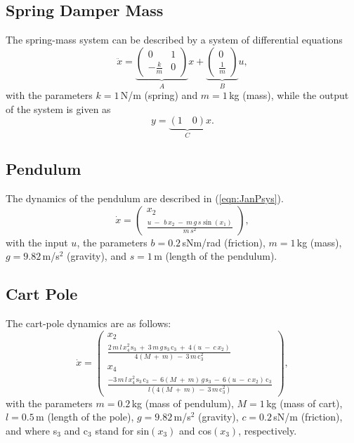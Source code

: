 \documentclass[letterpaper, 10 pt, conference]{ieeeconf}  %
\begin{document}
\subsection{Spring Damper Mass}
The spring-mass system can be described by a system of differential equations
\begin{equation}\label{eqn:JanSMsys}
	\ddot{x}=
	\underbrace{
		\left( {\begin{array}{cc}
			0 &1\\
			-\frac{k}{m} &0\end{array} } \right)}_{A}x + 
	\underbrace{
		\left( {\begin{array}{cc}
		0\\
		\frac{1}{m}\end{array} } \right)}_{B}u,
\end{equation}
with the parameters $k=1$\,N/m (spring) and $m=1$\,kg (mass),
while the output of the system is given as
\begin{equation}\label{eqn:JanSMoutput}
	y=
	\underbrace{
		(1\quad 0)}_{C}x.
\end{equation}
\subsection{Pendulum}
The dynamics of the pendulum are described in (\ref{eqn:JanPsys}).
\begin{equation}\label{eqn:JanPsys}
\dot{x}=
	\left( {\begin{array}{cc}
		x_2\\
		\tfrac{u \: - \: \,b\,x_2 \: - \: m\,g\,s\sin(x_1)}{m\,s^2}\end{array} } \right),
\end{equation}
with the input $u$, the parameters $b=0.2$\,sNm/rad (friction), $m=1$\,kg (mass), $g=9.82$\,m/s$^2$ (gravity), and $s=1$\,m (length of the pendulum).
\subsection{Cart Pole}
The cart-pole dynamics are as follows:
\begin{equation}\label{eqn:JanCPsys}
\dot{x}=
\left( {\begin{array}{cc}
	x_2\\
	\frac{2\,m\,l\,x_4^2\,\text{s}_3 \: + \: 3\,m\,g\,\text{s}_3\,\text{c}_3 \: + \: 4(u \: - \: c\,x_2)}{4(M \: + \: m) \: - \: 3\,m\,\text{c}_3^2}\\
	x_4\\
	\frac{-3\,m\,l\,x_4^2\,\text{s}_3\,\text{c}_3 \: - \: 6(M \: + \: m)\,g\,\text{s}_3 \: - \: 6(u \: - \: c\,x_2)\,\text{c}_3}{l(4(M \: + \: m) \: - \: 3\,m\,\text{c}_3^2)}\end{array} } \right),
\end{equation}
with the parameters $m=0.2$\,kg (mass of pendulum),  $M=1$\,kg (mass of cart), $l=0.5$\,m (length of the pole), $g=9.82$\,m/s$^2$ (gravity), $c=0.2$\,sN/m (friction), and where s$_3$ and c$_3$ stand for sin$(x_3)$ and cos$(x_3)$, respectively.
\end{document}
